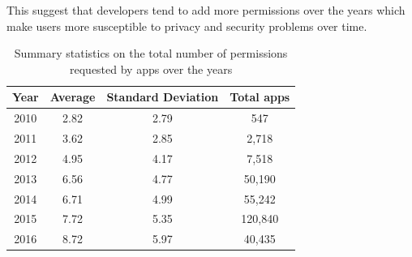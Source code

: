 This suggest that developers tend to add more permissions over the years which make users more susceptible to privacy and security problems over time.
\begin{table}[t]
	\def\arraystretch{2}
	\centering
	\begin{tabular}{ |c|c|c|c| }
		\hline
		Year & Average & Standard Deviation & Total apps \\ \hline
		2010 & 2.82 & 2.79 & 547 \\  \hline
		2011 & 3.62 & 2.85 & 2,718 \\ \hline
		2012 & 4.95 & 4.17 & 7,518 \\ \hline
		2013 & 6.56 & 4.77 & 50,190 \\ \hline
		2014 & 6.71 & 4.99 & 55,242 \\ \hline
		2015 & 7.72 & 5.35 & 120,840 \\ \hline
		2016 & 8.72 & 5.97 & 40,435 \\
		\hline
	\end{tabular}
	\caption{Summary statistics on the total number of permissions requested by apps over the years}
	\label{tab:average_permissions_years}
\end{table}
